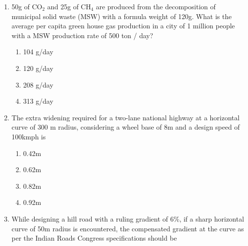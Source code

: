 \documentclass[journal]{IEEEtran}
\begin{document}
\begin{enumerate}
{			
			\begin{multicols}{4}
				\begin{enumerate}
					\item 100\%
					\item 93\%
					\item 80\%
					\item 65\%
				\end{enumerate}
			\end{multicols}
			
		}
 	\item{
			50g of CO$_2$ and 25g of CH$_4$ are produced from the decomposition of municipal solid waste (MSW) with a formula weight of 120g. What is the average per capita green house gas production in a city of 1 million people with a MSW production rate of 500 ton / day?\text{ }
			\hfill
			
			
			\begin{multicols}{2}
				\begin{enumerate}
					\item 104 g/day 
					\item 120 g/day 
					\item 208 g/day 
					\item 313 g/day 
				\end{enumerate}
			\end{multicols}
			
		}
    \item{
            The extra widening required for a two-lane national highway at a horizontal curve of 300 m radius, considering a wheel base of 8m and a design speed of 100kmph is\text{ }
             \hfill
                
            \begin{multicols}{4}
                \begin{enumerate}
                	\item 0.42m
                	\item 0.62m
                	\item 0.82m
                	\item 0.92m
                \end{enumerate}
            \end{multicols}

        
        }
    \item{
            While designing a hill road with a ruling gradient of 6\%, if a sharp horizontal curve of 50m radius is encountered, the compensated gradient at the curve as per the Indian Roads Congress specifications should be
             \hfill
                
}
\end{enumerate}
\end{document}
